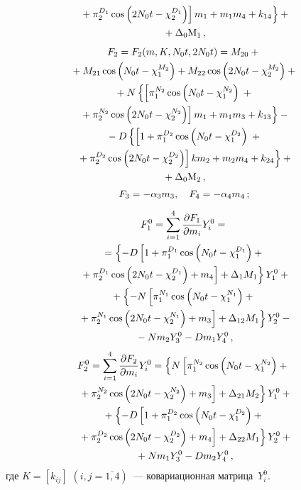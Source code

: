 \begin{multicols}{2}
\begin{multline*}
\left.\left.{} + \pi_2^{D_1}\cos \left( 2 N_0 t - \chi_2^{D_1}\right)\right]
 m_1 + m_1m_4 + k_{14}\right\}+{}\\
{} +\Delta_0{\rm M}_1 \,,
 \end{multline*}
 \begin{multline*}
F_2 = F_2(m,K, N_0 t, 2 N_0t)= M_{20}+{}\\
{}+M_{21} \cos \left( N_0 t -\chi_1^{M_2}\right)
 + M_{22}\cos \left( 2 N_0 t - \chi_2^{M_2}\right) +{}\\
{}+ N\left\{ \left[ \pi_1^{N_2}
\cos \left( N_0 t -\chi_1^{N_2}\right)\right.\right.+{}\\
\left.\left.{} +\pi_2^{N_2} \cos \left( 2 N_0 t - \chi_2^{N_2}\right)\right]
 m_1 + m_1m_3 + k_{13}\right\} -{}\\
{}- D \left\{ \left[ 1 + \pi_1^{D_2}
\cos \left( N_0 t -\chi_1^{D_2}\right)\right.\right.+{}\\
\left.\left.{} + \pi_2^{D_2}\cos \left( 2 N_0 t -
 \chi_2^{D_2}\right)\right] k m_2 + m_2m_4 + k_{24}\right\} +{}\\
{}+\Delta_0{\rm M}_2\,,
 \end{multline*}
 \begin{equation}
 F_3 =-\alpha_3m_3,\quad F_4 =-\alpha_4 m_4\,;
 \label{e14s}
\end{equation}
\pagebreak

\noindent
\begin{multline*}
 F_1^0 = \sum\limits_{i=1}^4 \displaystyle\frac{\displaystyle \partial F_1\mathstrut}{\displaystyle \partial m_i\mathstrut}Y_i^0 ={}\\
 {}=
\left\{- D \left[ 1+\pi_1^{D_1} \cos \left(N_0 t -\chi_1^{D_1}\right)+{}\right.\right.\\
\left.\left.{}+ \pi_2^{D_1} \cos \left(2N_0t -\chi_2^{D_1}\right)+m_4\right]+\Delta_1 M_1\right\} Y_1^0 +{}\\
{}+\left\{- N \left[ \pi_1^{N_1} \cos \left(N_0t -\chi_1^{N_1}\right)+{}\right.\right.\\
\left.\left.{}+ \pi_2^{N_1} \cos \left(2N_0t -\chi_2^{N_1}\right)+ m_3\right] 
+\Delta_{12} M_1 \right\}Y_2^0 -{}\\
{}- Nm_2 Y_3^0 - D m_1 Y_4^0\,,
 \end{multline*}
 \begin{multline}
 F_2^0 = \sum\limits_{i=1}^4 \displaystyle\frac{\displaystyle \partial F_2\mathstrut}{\displaystyle  \partial m_i\mathstrut}Y_i^0 =
\left\{ N \left[\pi_1^{N_2} \cos \left(N_0 t -\chi_1^{N_2}\right)+{}\right.\right.\\
\left.\left.{}+ \pi_2^{N_2} \cos \left(2N_0t -\chi_2^{N_2}\right)+m_3\right] 
+\Delta_{21} M_2 \right\}Y_1^0+{}\\
{}+\left\{ - D \left[1+ \pi_1^{D_2} \cos \left(N_0t -\chi_1^{D_2}\right)+{}\right.\right.\\
\left.\left.{}+ \pi_2^{D_2} \cos \left(2N_0t -\chi_2^{D_2}\right)+ m_4\right]+\Delta_{22}M_1 \right\}Y_2^0 +{}\\
{}+ Nm_1 Y_3^0 - D m_2 Y_4^0\,,
 \label{e15s}
 \end{multline}
где $K= \left[k_{ij}\right]$ $(i,j=\overline{1,4})$~--- ковариационная
матрица~$Y^0_i$.


\end{multicols}
